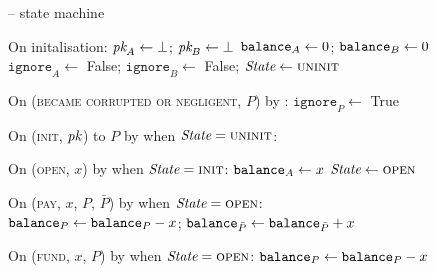 \begin{figure}[H]
  \begin{systembox}{\fchan{} -- state machine}
    \begin{algorithmic}[1]
      \State On initalisation:
      \Indent
        \State $\textit{pk}_{A} \gets \bot$; $\textit{pk}_{B} \gets \bot$
        \State $\texttt{balance}_{A} \gets 0$; $\texttt{balance}_{B} \gets 0$
        \State $\texttt{ignore}_A \gets$ False;
        $\texttt{ignore}_B \gets$ False;
        \State $\itistate \gets \textsc{uninit}$
      \EndIndent
      \Statex

      \State On (\textsc{became corrupted or negligent}, $P$) by \adversary:
      \Indent
        \State $\texttt{ignore}_P \gets$ True
         
      \EndIndent
      \Statex

      \State On (\textsc{init}, $\textit{pk}_{}$) to $P$ by \environment when $\itistate
      = \textsc{uninit}$:
      \Indent
      \EndIndent
      \Statex

      \State On (\textsc{open}, $x$) by \adversary when $\itistate =
      \textsc{init}$:
      \Indent
        \State $\texttt{balance}_{A} \gets x$
        \State $\itistate \gets \textsc{open}$
      \EndIndent
      \Statex

      \State On (\textsc{pay}, $x$, $P$, $\bar{P}$) by \adversary when
      $\itistate = \textsc{open}$: 
      \Indent
        \State $\texttt{balance}_{P} \gets \texttt{balance}_{P} - x$; $\texttt{balance}_{\bar{P}} \gets
        \texttt{balance}_{\bar{P}} + x$
      \EndIndent
      \Statex

      \State On (\textsc{fund}, $x$, $P$) by \adversary when $\itistate =
      \textsc{open}$:
      \Indent
        \State $\texttt{balance}_{P} \gets \texttt{balance}_{P} - x$
      \EndIndent
      \Statex


\end{algorithmic}
\end{systembox}
\end{figure}
